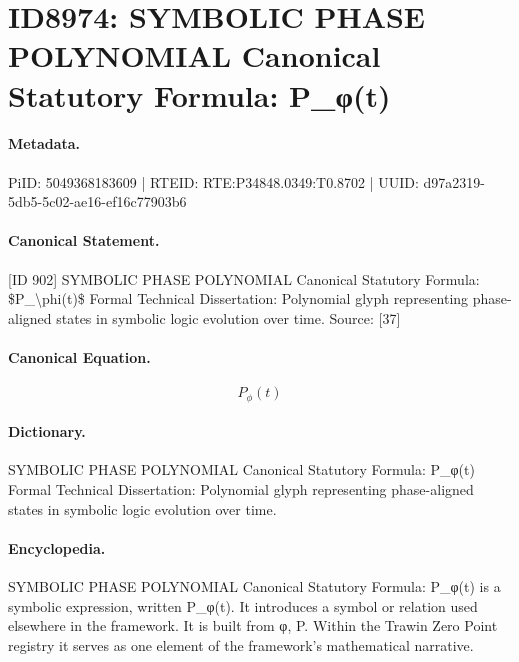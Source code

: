 \section*{ID8974: SYMBOLIC PHASE POLYNOMIAL Canonical Statutory Formula: P\_φ(t)}
\paragraph{Metadata.}
PiID: 5049368183609 | RTEID: RTE:P34848.0349:T0.8702 | UUID: d97a2319-5db5-5c02-ae16-ef16c77903b6

\paragraph{Canonical Statement.}
[ID 902] SYMBOLIC PHASE POLYNOMIAL Canonical Statutory Formula: \$P\_\textbackslash{}phi(t)\$ Formal Technical Dissertation: Polynomial glyph representing phase-aligned states in symbolic logic evolution over time. Source: [37]

\paragraph{Canonical Equation.}
\[
P_\phi(t)
\]

\paragraph{Dictionary.}
SYMBOLIC PHASE POLYNOMIAL Canonical Statutory Formula: P\_φ(t) Formal Technical Dissertation: Polynomial glyph representing phase-aligned states in symbolic logic evolution over time.

\paragraph{Encyclopedia.}
SYMBOLIC PHASE POLYNOMIAL Canonical Statutory Formula: P\_φ(t) is a symbolic expression, written P\_φ(t). It introduces a symbol or relation used elsewhere in the framework. It is built from φ, P. Within the Trawin Zero Point registry it serves as one element of the framework's mathematical narrative.
